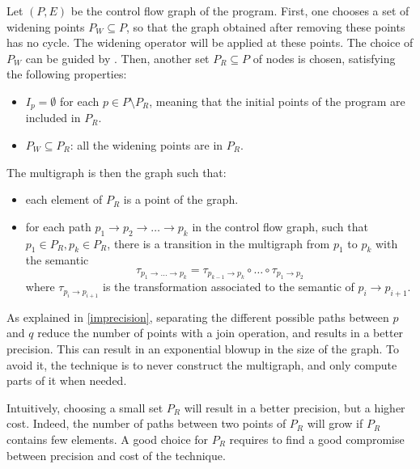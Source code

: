 \documentclass[a4paper,english,titlepage,11pt]{report}
\begin{document}
	Let $(P,E)$ be the control flow graph of the program.
	First, one chooses a set of widening points $P_W \subseteq P$, so that the graph
	obtained after removing these points has no cycle. The widening operator
	will be applied at these points. The choice of $P_W$ can be guided by
	\cite{Bou92}.
	Then, another set $P_R \subseteq P$ of nodes is chosen, satisfying the
	following properties:
	\begin{itemize}
	\item $I_p = \emptyset$ for each $p \in P \setminus P_R$, meaning that the initial
	points of the program are included in $P_R$.
	\item $P_W \subseteq P_R$: all the widening points are in $P_R$.
	\end{itemize} 

	The multigraph is then the graph such that:
	\begin{itemize}
	\item each element of $P_R$ is a point of the graph.
	\item for each path $p_1 \rightarrow p_2 \rightarrow \dots \rightarrow p_k$
	in the control flow graph, such that $p_1 \in P_R, p_k \in P_R$,
	there is a transition in the multigraph from $p_1$ to $p_k$ with the
	semantic $$\tau_{p_1 \rightarrow \dots \rightarrow p_k} = \tau_{p_{k-1}
	\rightarrow p_k} \circ
	\dots \circ \tau_{p_1 \rightarrow p_2}$$ where $\tau_{p_i \rightarrow
	p_{i+1}}$ is the transformation associated to the semantic of $p_i
	\rightarrow p_{i+1}$.
	\end{itemize}

	As explained in \ref{imprecision}, separating the different
	possible paths between $p$ and $q$ reduce the number of points with a join
	operation, and results in a better precision.
	This can result in an exponential blowup in the size of the graph. To avoid
	it, the technique is to never construct the multigraph, and only compute
	parts of it when needed.

	Intuitively, choosing a small set $P_R$ will result in a better precision,
	but a higher cost. 
	Indeed, the number of paths between two points of $P_R$ will grow if $P_R$
	contains few elements.
	A good choice for $P_R$ requires to find a good
	compromise between precision and cost of the technique.
\end{document}
